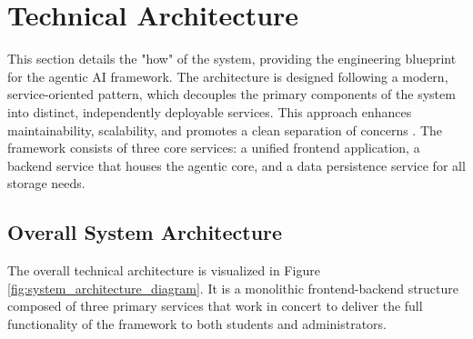 
\section{Technical Architecture}
\label{chap:technical_architecture}

This section details the "how" of the system, providing the engineering blueprint for the agentic AI framework. The architecture is designed following a modern, service-oriented pattern, which decouples the primary components of the system into distinct, independently deployable services. This approach enhances maintainability, scalability, and promotes a clean separation of concerns \cite{newman2021buildingmicroservices, richards2020softwarearchitecture}. The framework consists of three core services: a unified frontend application, a backend service that houses the agentic core, and a data persistence service for all storage needs.

\subsection{Overall System Architecture}
\label{sec:overall_system_architecture}

The overall technical architecture is visualized in Figure \ref{fig:system_architecture_diagram}. It is a monolithic frontend-backend structure composed of three primary services that work in concert to deliver the full functionality of the framework to both students and administrators.

